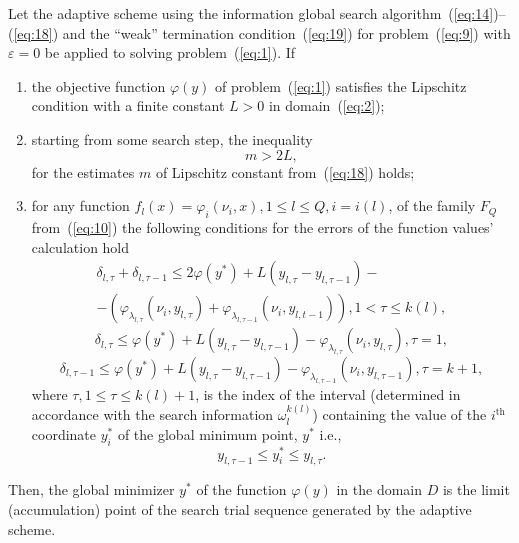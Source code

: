 \documentclass[smallextended]{svjour3}
\let\origref\ref
\renewcommand{\ref}[1]{(\origref{#1})}
\begin{document}
\begin{mytheorem}
\label{th:2}
Let the adaptive scheme using the information global search algorithm~\ref{eq:14}--\ref{eq:18} and the ``weak'' termination condition~\ref{eq:19} for problem~\ref{eq:9} with $\varepsilon = 0$ be applied to solving problem~\ref{eq:1}. If
\begin{enumerate}[label=\roman*)]
  \item the objective function $\varphi(y)$ of problem~\ref{eq:1} satisfies the Lipschitz condition with a finite constant $L > 0$ in domain~\ref{eq:2};

  \item starting from some search step, the inequality
  \begin{equation}
  \label{eq:23}
  m > 2L,
  \end{equation}
  for the estimates $m$ of Lipschitz constant from~\ref{eq:18} holds;

  \item for any function $f_l(x) = \varphi_i(\nu_i, x), 1 \leq l \leq Q, i = i(l)$, of the family $F_Q$ from~\ref{eq:10} the following conditions for the errors of the function values' calculation hold
  \begin{multline}
  \label{eq:24}
  \delta_{l, \tau} + \delta_{l, \tau - 1} \leq 2\varphi(y^*) + L(y_{l, \tau} - y_{l, \tau - 1}) - \\
  - (\varphi_{\lambda_{l, \tau}}(\nu_i, y_{l, \tau}) + \varphi_{\lambda_{l, \tau - 1}}(\nu_i, y_{l, t - 1})), 1 < \tau \leq k(l),
  \end{multline}
  \begin{equation}
  \label{eq:25}
  \delta_{l, \tau} \leq \varphi(y^*) + L(y_{l, \tau} - y_{l, \tau - 1}) - \varphi_{\lambda_{l, \tau}}(\nu_i, y_{l, \tau}), \tau = 1,
  \end{equation}
  \begin{equation}
  \label{eq:26}
  \delta_{l, \tau - 1} \leq \varphi(y^*) + L(y_{l, \tau} - y_{l, \tau - 1}) - \varphi_{\lambda_{l, \tau - 1}}(\nu_i, y_{l, \tau - 1}), \tau = k + 1,
  \end{equation}
  where $\tau, 1 \leq \tau \leq k(l) + 1$, is the index of the interval (determined in accordance with the search information $\omega_l^{k(l)}$) containing the value of the $i^{\text{th}}$ coordinate $y_i^*$ of the global minimum point, $y^*$ i.e.,
  \begin{equation}
  \label{eq:27}
  y_{l, \tau - 1} \leq y_i^* \leq y_{l, \tau}.
  \end{equation}
\end{enumerate}

Then, the global minimizer $y^*$ of the function $\varphi(y)$ in the domain $D$ is the limit (accumulation) point of the search trial sequence generated by the adaptive scheme.
\end{mytheorem}
\end{document}
